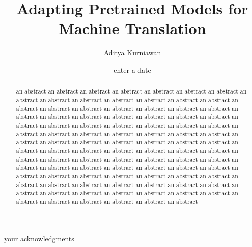 \documentclass[12pt, a4paper]{report}
\theoremstyle{definition}
\theoremstyle{definition}%
\theoremstyle{definition}%
\theoremstyle{definition}%
\theoremstyle{definition}%
\theoremstyle{definition}%
\begin{document}
\title{Adapting Pretrained Models for Machine Translation}
\author{Aditya Kurniawan}
\date{enter a date}

\frontmatter


\begin{acknowledgements}
    your acknowledgments
\end{acknowledgements}

\begin{abstract}
    an abstract an abstract an abstract an abstract an abstract an abstract an abstract an abstract an abstract an abstract an abstract an abstract an abstract an abstract an abstract an abstract an abstract an abstract an abstract an abstract an abstract an abstract an abstract an abstract an abstract an abstract an abstract an abstract an abstract an abstract an abstract an abstract an abstract an abstract an abstract an abstract an abstract an abstract an abstract an abstract an abstract an abstract an abstract an abstract an abstract an abstract an abstract an abstract an abstract an abstract an abstract an abstract an abstract an abstract an abstract an abstract an abstract an abstract an abstract an abstract an abstract an abstract an abstract an abstract an abstract an abstract an abstract an abstract an abstract an abstract an abstract an abstract an abstract an abstract an abstract an abstract an abstract an abstract an abstract an abstract an abstract an abstract an abstract an abstract an abstract an abstract an abstract an abstract an abstract an abstract an abstract an abstract an abstract an abstract an abstract an abstract an abstract
\end{abstract}

\tableofcontents

\listoffigures

\listoftables



\mainmatter

\end{document}

